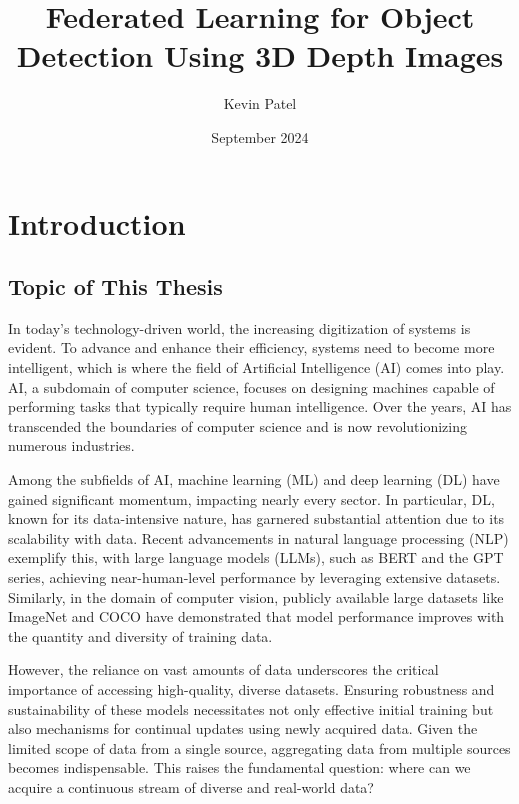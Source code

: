 \documentclass[thesis]{mas_proposal}
\title{Federated Learning for Object Detection Using 3D Depth Images}
\author{Kevin Patel}
\date{September 2024}
\begin{document}
\maketitle

\pagestyle{plain}

\section{Introduction}

\subsection{Topic of This Thesis}

\indent \indent In today's technology-driven world, the increasing digitization of systems is evident. To advance and enhance their efficiency, systems need to become more intelligent, which is where the field of Artificial Intelligence (AI) comes into play. AI, a subdomain of computer science, focuses on designing machines capable of performing tasks that typically require human intelligence. Over the years, AI has transcended the boundaries of computer science and is now revolutionizing numerous industries.

Among the subfields of AI, machine learning (ML) and deep learning (DL) have gained significant momentum, impacting nearly every sector. In particular, DL, known for its data-intensive nature, has garnered substantial attention due to its scalability with data. Recent advancements in natural language processing (NLP) exemplify this, with large language models (LLMs), such as BERT \cite{devlin2018bert} and the GPT series\cite{Radford2019LanguageMA}, achieving near-human-level performance by leveraging extensive datasets. Similarly, in the domain of computer vision, publicly available large datasets like ImageNet\cite{deng2009imagenet} and COCO\cite{lin2014microsoft} have demonstrated that model performance improves with the quantity and diversity of training data.

However, the reliance on vast amounts of data underscores the critical importance of accessing high-quality, diverse datasets. Ensuring robustness and sustainability of these models necessitates not only effective initial training but also mechanisms for continual updates using newly acquired data. Given the limited scope of data from a single source, aggregating data from multiple sources becomes indispensable. This raises the fundamental question: where can we acquire a continuous stream of diverse and real-world data?
\end{document}

